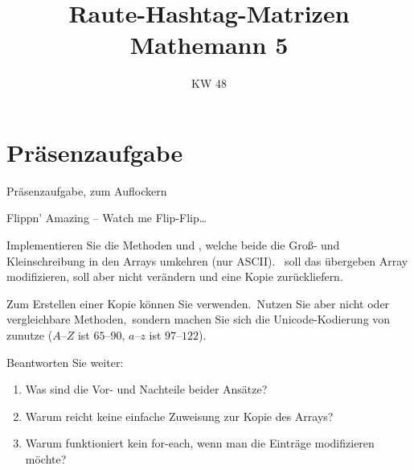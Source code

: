 \relax\relax

\iffull
\title[Fünftes Tutorium -- Übungsblatt 5]{Raute-Hashtag-Matrizen\\\small Mathemann 5}
\date{\sffamily KW 48}

\usepackage{tikzpingus}

\usetikzlibrary{decorations.pathreplacing,decorations.text}

\hypersetup{colorlinks=false}



\fi
\section{Präsenzaufgabe}
\begin{frame}[fragile, c]{Präsenzaufgabe, zum Auflockern}
    \begin{aufgabe}{Flippn' Amazing -- Watch me Flip-Flip\ldots}
        \vspace*{-.125\topsep-\baselineskip}\par\small\pause Implementieren Sie die Methoden  und , welche beide die Groß- und Kleinschreibung in den Arrays umkehren (nur ASCII).\pause\  soll das übergeben Array modifizieren,  soll  aber nicht verändern und eine  Kopie zurückliefern.

        \pause Zum Erstellen einer Kopie können Sie  verwenden.\pause\ Nutzen Sie aber nicht  oder vergleichbare Methoden,\pause\ sondern machen Sie sich die Unicode-Kodierung von  zunutze (\(A\)--\(Z\) ist \(65\)--\(90\), \(a\)--\(z\) ist \(97\)--\(122\)).

        \pause Beantworten Sie weiter:\vspace*{-.66\topsep} \begin{enumerate}[<+(1)->]
            \itemsep0pt
            \item Was sind die Vor- und Nachteile beider Ansätze?
            \item Warum reicht keine einfache Zuweisung zur Kopie des Arrays?
            \item Warum funktioniert kein for-each, wenn man die Einträge modifizieren möchte?
        \end{enumerate}
    \end{aufgabe}
\end{frame}

